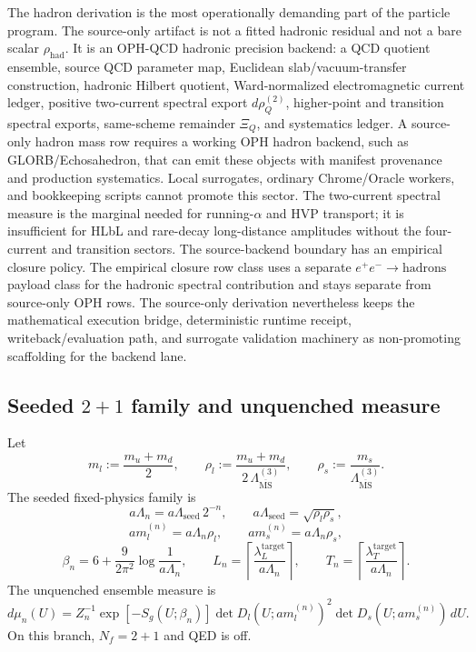 \documentclass[11pt]{article}
\begin{document}
The hadron derivation is the most operationally demanding part of the particle program. The
source-only artifact is not a fitted hadronic residual and not a bare scalar
\(\rho_{\mathrm{had}}\). It is an OPH-QCD hadronic precision backend: a QCD quotient
ensemble, source QCD parameter map, Euclidean slab/vacuum-transfer construction, hadronic
Hilbert quotient, Ward-normalized electromagnetic current ledger, positive two-current
spectral export \(d\rho_Q^{(2)}\), higher-point and transition spectral exports,
same-scheme remainder \(\Xi_Q\), and systematics ledger. A source-only hadron mass row requires
a working OPH hadron backend, such as GLORB/Echosahedron, that can emit these objects with
manifest provenance and production systematics. Local surrogates, ordinary Chrome/Oracle
workers, and bookkeeping scripts cannot promote this sector. The two-current spectral measure is
the marginal needed for running-\(\alpha\) and HVP transport; it is insufficient for HLbL and
rare-decay long-distance amplitudes without the four-current and transition sectors. The
source-backend boundary has an empirical closure policy. The empirical closure row class uses a
separate \(e^+e^-\to\mathrm{hadrons}\) payload class for the hadronic spectral contribution and
stays separate from source-only OPH rows. The source-only derivation nevertheless keeps the
mathematical execution bridge, deterministic runtime receipt, writeback/evaluation path, and
surrogate validation machinery as non-promoting scaffolding for the backend lane.

\subsection{Seeded \(2+1\) family and unquenched measure}

Let
\[
m_l := \frac{m_u+m_d}{2},
\qquad
\rho_l := \frac{m_u+m_d}{2\,\Lambda_{\overline{\mathrm{MS}}}^{(3)}},
\qquad
\rho_s := \frac{m_s}{\Lambda_{\overline{\mathrm{MS}}}^{(3)}}.
\]
The seeded fixed-physics family is
\[
a\Lambda_n = a\Lambda_{\mathrm{seed}}\,2^{-n},
\qquad
a\Lambda_{\mathrm{seed}} = \sqrt{\rho_l \rho_s},
\]
\[
a m_l^{(n)} = a\Lambda_n \rho_l,
\qquad
a m_s^{(n)} = a\Lambda_n \rho_s,
\]
\[
\beta_n = 6 + \frac{9}{2\pi^2}\log\!\frac{1}{a\Lambda_n},
\qquad
L_n = \left\lceil \frac{\lambda_L^{\mathrm{target}}}{a\Lambda_n}\right\rceil,
\qquad
T_n = \left\lceil \frac{\lambda_T^{\mathrm{target}}}{a\Lambda_n}\right\rceil.
\]
The unquenched ensemble measure is
\[
d\mu_n(U)
=
Z_n^{-1}
\exp[-S_g(U;\beta_n)]
\det D_l(U; a m_l^{(n)})^2
\det D_s(U; a m_s^{(n)})
\,dU.
\]
On this branch, \(N_f=2+1\) and QED is off.
\end{document}
